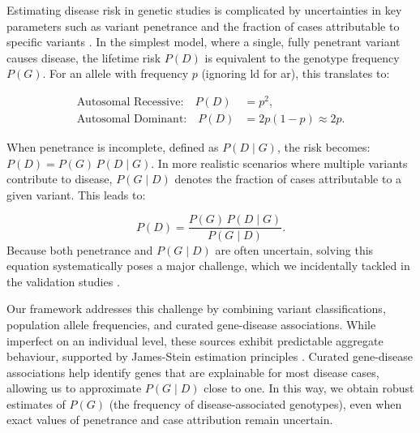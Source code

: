 Estimating disease risk in genetic studies is complicated by uncertainties in key parameters such as variant penetrance and the fraction of cases attributable to specific variants \cite{zschocke_mendelian_2023}. 
In the simplest model, where a single, fully penetrant variant causes disease, the lifetime risk \(P(D)\) is equivalent to the genotype frequency \(P(G)\). 
For an allele with frequency \(p\) (ignoring \ac{ld} for \ac{ar}), this translates to:

\[
\begin{aligned}
\text{Autosomal Recessive:} \quad P(D) &= p^2, \\
\text{Autosomal Dominant:} \quad P(D) &= 2p(1-p) \approx 2p.
\end{aligned}
\]

When penetrance is incomplete, defined as \(P(D\mid G)\), the risk becomes:
$P(D) = P(G)\,P(D\mid G).$
In more realistic scenarios where multiple variants contribute to disease, \(P(G\mid D)\) denotes the fraction of cases attributable to a given variant. This leads to:

\[
P(D) = \frac{P(G)\,P(D\mid G)}{P(G\mid D)}.
\]
Because both penetrance and \(P(G\mid D)\) are often uncertain, solving this equation systematically poses a major challenge, which we incidentally tackled in the validation studies
\cite{minikel_quantifying_2016, whiffin_using_2017}. %

Our framework addresses this challenge by combining variant classifications, population allele frequencies, and curated gene-disease associations. 
While imperfect on an individual level, these sources exhibit predictable aggregate behaviour, supported by James-Stein estimation principles \cite{efron_steins_1973}.
Curated gene-disease associations help identify genes that are explainable for most disease cases, allowing us to approximate \(P(G\mid D)\) close to one. In this way, we obtain robust estimates of \(P(G)\) (the frequency of disease-associated genotypes), even when exact values of penetrance and case attribution remain uncertain.

